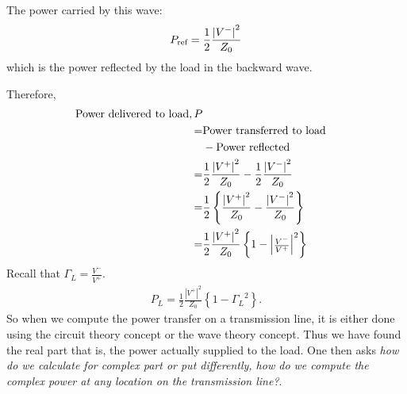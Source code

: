 The power carried by this wave:
\begin{align*}
P_{\textnormal{ref}} = \frac{1}{2}\frac{{|V^-|}^2}{Z_0}
\end{align*}
which is the power reflected by the load in the backward wave.

Therefore,
\begin{align*} 
\textnormal{Power delivered to load}, P\\
=& \textnormal{Power transferred to load}\\
&- \textnormal{Power reflected}\\
=& \frac{1}{2} \frac{{|V^+|}^2}{Z_0} -\frac{1}{2} \frac{{|V^-|}^2 }{Z_0}\\
=& \frac{1}{2} \left\lbrace \frac{{|V^+| }^2}{Z_0} -\frac{ {|V^-|}^2 }{Z_0} \right\rbrace\\
=& \frac{1}{2} \frac{{|V^+|}^2}{Z_0} \left\lbrace 1 - {
\begin{vmatrix}
\frac{V^-}{V^+}
\end{vmatrix}^2}\right\rbrace
\end{align*}
Recall that $\Gamma_L =\frac{V^-}{V^+}$.
\begin{align*}
P_L=\frac{1}{2} \frac{{|V^+|}^2}{Z_0} \left\lbrace 1 - { \Gamma_L }^2 \right\rbrace.
\end{align*}
So when we compute the power transfer on a transmission line, it is either done using the circuit theory concept or the wave theory concept. Thus we have found the real part that is, the power actually supplied to the load. One then asks \emph{how do we calculate for complex part or put differently, how do we compute the complex power at any location on the transmission line?}. 


